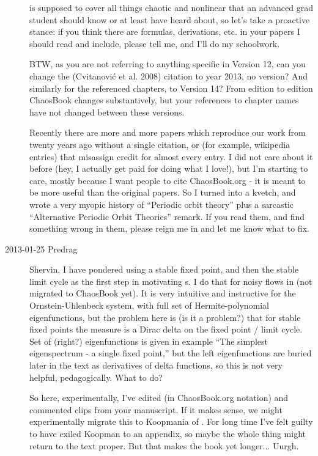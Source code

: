\begin{description}
\wwwcb{} is supposed to cover all things chaotic and nonlinear that
an advanced grad student should know or at least have heard about, so
let's take a proactive stance: if you think there are formulas,
derivations, etc. in your papers I should read and include, please
tell me, and I'll do my schoolwork.

BTW, as you are not referring to anything specific in Version 12, can
you change the (Cvitanovi\'c et al. 2008) citation to year 2013, no
version? And similarly for the referenced chapters, to Version 14?
From edition to edition ChaosBook changes substantively, but your
references to chapter names have not changed between these versions.

Recently there are more and more papers which reproduce our work from
twenty years ago without a single citation, or (for example,
wikipedia entries) that misassign credit for almost every entry. I
did not care about it before (hey, I actually get paid for doing what
I love!), but I'm starting to care, mostly because I want people to
cite ChaosBook.org - it is meant to be more useful than the original
papers. So I turned into a kvetch, and wrote a very myopic history of
 {``Periodic orbit theory''} plus a
sarcastic  {``Alternative Periodic Orbit
Theories''} remark. If you read them, and find something wrong in
them, please reign me in and let me know what to fix.

\item[2013-01-25 Predrag] Shervin, I have pondered using a stable
fixed point, and then the stable limit cycle as the first step in
motivating \Fd s. I do that for noisy flows in
 (not migrated to ChaosBook yet). It is
very intuitive and instructive for the Ornstein-Uhlenbeck system,
with full set of Hermite-polynomial eigenfunctions, but the problem
here is (is it a problem?) that for stable fixed points the measure
is a Dirac delta on the fixed point / limit cycle. Set of (right?)
eigenfunctions is given in  example ``The simplest
eigenspectrum - a single fixed point,'' but the left eigenfunctions
are buried later in the text as derivatives of delta functions, so
this is not very helpful, pedagogically. What to do?

So here, experimentally, I've edited (in ChaosBook.org notation) and
commented clips from your manuscript. If it makes
sense, we might experimentally migrate this to Koopmania of
. For long time I've felt guilty
to have exiled Koopman to an appendix, so maybe the whole thing might
return to the text proper. But that makes the book yet longer...
Uurgh.




\end{description}
